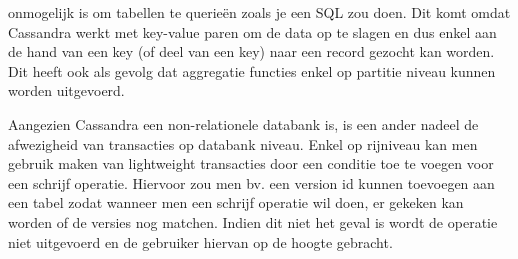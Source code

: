 \documentclass{article}
\begin{document}
	onmogelijk is om tabellen te querieën zoals je een SQL zou doen. 
	Dit komt omdat Cassandra werkt met key-value paren om de data op te slagen en dus enkel aan de hand van een key 
	(of deel van een key) naar een record gezocht kan worden. 
	Dit heeft ook als gevolg dat aggregatie functies enkel op partitie niveau kunnen worden uitgevoerd.
	\par
	Aangezien Cassandra een non-relationele databank is, is een ander nadeel de afwezigheid van transacties op databank niveau.
	Enkel op rijniveau kan men gebruik maken van lightweight transacties door een conditie toe te voegen voor een schrijf operatie.
	Hiervoor zou men bv. een version id kunnen toevoegen aan een tabel zodat wanneer men een schrijf operatie wil doen,
	er gekeken kan worden of de versies nog matchen. 
	Indien dit niet het geval is wordt de operatie niet uitgevoerd en de gebruiker hiervan op de hoogte gebracht.
\end{document}
